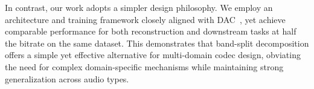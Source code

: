 \documentclass[11pt]{article}
\begin{document}
In contrast, our work adopts a simpler design philosophy. We employ an architecture and training framework closely aligned with DAC~\cite{kumar2023high}, yet achieve comparable performance for both reconstruction and downstream tasks at half the bitrate on the same dataset. This demonstrates that band-split decomposition offers a simple yet effective alternative for multi-domain codec design, obviating the need for complex domain-specific mechanisms while maintaining strong generalization across audio types.






\end{document}
